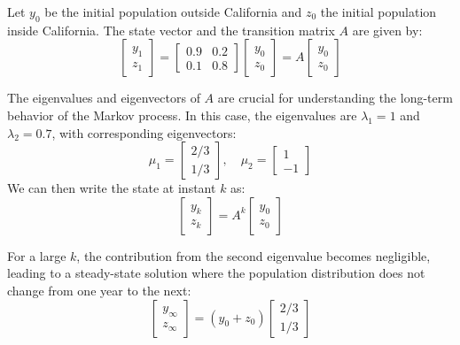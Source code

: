 Let $y_0$ be the initial population outside California and $z_0$ the initial population inside California. The state vector and the transition matrix $A$ are given by:
\begin{equation}
    \begin{bmatrix}
    y_1 \\
    z_1 
    \end{bmatrix} = 
    \begin{bmatrix}
    0.9 & 0.2 \\
    0.1 & 0.8 
    \end{bmatrix}
    \begin{bmatrix}
    y_0 \\
    z_0 
    \end{bmatrix} = A 
    \begin{bmatrix}
    y_0 \\
    z_0 
    \end{bmatrix}
\end{equation}


The eigenvalues and eigenvectors of $A$ are crucial for understanding the long-term behavior of the Markov process. In this case, the eigenvalues are $\lambda_1 = 1$ and $\lambda_2 = 0.7$, with corresponding eigenvectors:
\begin{equation}
    \mu_1 = \begin{bmatrix}
    2/3 \\
    1/3 
    \end{bmatrix}, \quad
    \mu_2 = \begin{bmatrix}
    1 \\
    -1 
    \end{bmatrix}
\end{equation}
We can then write the state at instant $k$ as:
\begin{equation}
    \begin{bmatrix}
    y_k \\
    z_k 
    \end{bmatrix} = A^k
    \begin{bmatrix}
    y_0 \\
    z_0 
    \end{bmatrix}
\end{equation}

For a large $k$, the contribution from the second eigenvalue becomes negligible, leading to a steady-state solution where the population distribution does not change from one year to the next:
\begin{equation}
    \begin{bmatrix}
    y_{\infty} \\
    z_{\infty} 
    \end{bmatrix} = \left( y_0 + z_0 \right)
    \begin{bmatrix}
    2/3 \\
    1/3 
    \end{bmatrix}
\end{equation}

